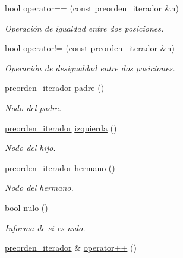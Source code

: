 \begin{DoxyCompactItemize}
\item 
bool \hyperlink{classArbolGeneral_1_1preorden__iterador_a40ce7061c6632d2c83d31ac7d7eb5772}{operator==} (const \hyperlink{classArbolGeneral_1_1preorden__iterador}{preorden\+\_\+iterador} \&n)
\begin{DoxyCompactList}\small\item\em Operación de igualdad entre dos posiciones. \end{DoxyCompactList}\item 
bool \hyperlink{classArbolGeneral_1_1preorden__iterador_a10082c5dc98b2878518a8d49032056a7}{operator!=} (const \hyperlink{classArbolGeneral_1_1preorden__iterador}{preorden\+\_\+iterador} \&n)
\begin{DoxyCompactList}\small\item\em Operación de desigualdad entre dos posiciones. \end{DoxyCompactList}\item 
\hyperlink{classArbolGeneral_1_1preorden__iterador}{preorden\+\_\+iterador} \hyperlink{classArbolGeneral_1_1preorden__iterador_af6da79d49b40e79f7e8108bea80d15dd}{padre} ()
\begin{DoxyCompactList}\small\item\em Nodo del padre. \end{DoxyCompactList}\item 
\hyperlink{classArbolGeneral_1_1preorden__iterador}{preorden\+\_\+iterador} \hyperlink{classArbolGeneral_1_1preorden__iterador_adb5df08e17d808c2cc730d8652265422}{izquierda} ()
\begin{DoxyCompactList}\small\item\em Nodo del hijo. \end{DoxyCompactList}\item 
\hyperlink{classArbolGeneral_1_1preorden__iterador}{preorden\+\_\+iterador} \hyperlink{classArbolGeneral_1_1preorden__iterador_ae112223697d9ffc1cdb9454436a8acd1}{hermano} ()
\begin{DoxyCompactList}\small\item\em Nodo del hermano. \end{DoxyCompactList}\item 
bool \hyperlink{classArbolGeneral_1_1preorden__iterador_a41286b60f0285afb9852679acb42c0b6}{nulo} ()
\begin{DoxyCompactList}\small\item\em Informa de si es nulo. \end{DoxyCompactList}\item 
\hyperlink{classArbolGeneral_1_1preorden__iterador}{preorden\+\_\+iterador} \& \hyperlink{classArbolGeneral_1_1preorden__iterador_a6ce61fb0ab8c1b0aa3bd91266618eeb5}{operator++} ()

\end{DoxyCompactItemize}
